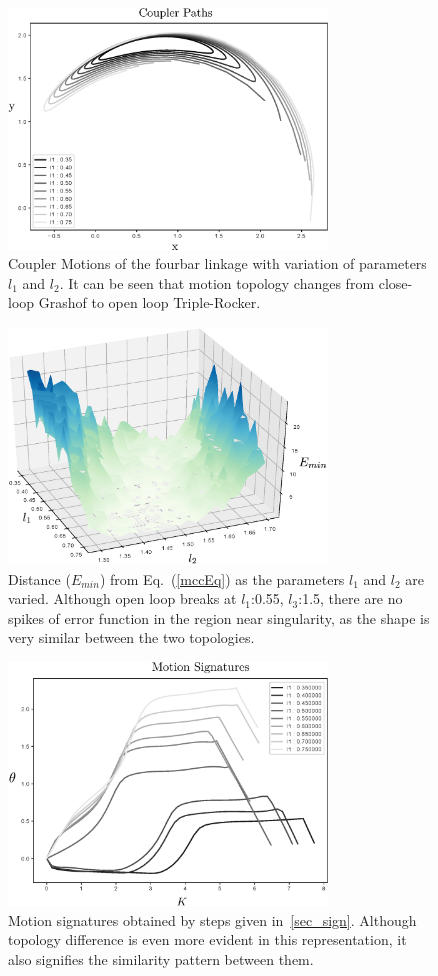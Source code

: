 \documentclass[twocolumn,10pt]{asme2e}
\newcommand{\req}[1]{(\ref{#1})}
\begin{document}
\begin{figure}
\centering
\includegraphics[width=240pt]{figure/fig_sa_coupler_curves.eps}
  \caption{Coupler Motions of the fourbar linkage with variation of parameters $l_1$ and $l_2$. It can be seen that motion topology changes from close-loop Grashof to open loop Triple-Rocker.}
\label{saCouplerCurves}
\end{figure}

\begin{figure}
\centering
\includegraphics[width=240pt]{figure/fig_sa_distance_function.eps}
  \caption{Distance ($E_{min}$) from Eq.~\req{mccEq} as the parameters $l_1$ and $l_2$ are varied. Although open loop breaks at $l_1$:0.55, $l_3$:1.5, there are no spikes of error function in the region near singularity, as the shape is very similar between the two topologies.}
\label{saErrorFunction}
\end{figure}

\begin{figure}
\centering
\includegraphics[width=240pt]{figure/fig_sa_motion_signatures.eps}
  \caption{Motion signatures obtained by steps given in~\ref{sec_sign}. Although topology difference is even more evident in this representation, it also signifies the similarity pattern between them.}
\label{saMotionSignatures}
\end{figure}
\end{document}
